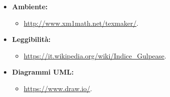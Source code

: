 \begin{itemize}
\item \textbf{Ambiente:}
	\begin{itemize}
		\item \url{http://www.xm1math.net/texmaker/}.
	\end{itemize}
\item \textbf{Leggibilità:}
	\begin{itemize}
		\item \url{https://it.wikipedia.org/wiki/Indice\_Gulpease}.
	\end{itemize}
\item \textbf{Diagrammi UML:}
\begin{itemize}
	\item \url{https://www.draw.io/}.
\end{itemize}

\end{itemize}

